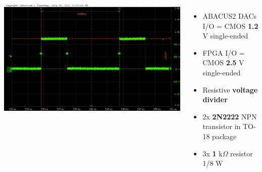 \documentclass[aspectratio=169]{beamer}
\begin{document}
\begin{frame}
\begin{columns}
\begin{center}
				\includegraphics[width=0.5 \textwidth]{IMG/probe/09-08-2021_clock-specks.png}
			\end{center}
			\begin{itemize}
				\item ABACUS2 DACs I/O = CMOS \textbf{1.2} V single-ended
				\item FPGA I/O = CMOS \textbf{2.5} V single-ended
				\item Resistive \textbf{voltage divider}
				\item 2x \textbf{2N2222} NPN transistor in TO-18 package
				\item 3x \textbf{1} k$\Omega$ resistor 1/8 W
			\end{itemize}
		\end{columns}
	\end{frame}
	
\end{document}
